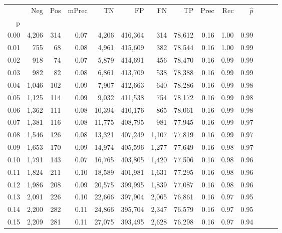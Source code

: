 \begin{tabular}{rrrrrrrrrrrrrr}
\toprule
{} &     Neg &    Pos & mPrec &       TN &       FP &      FN &      TP &  Prec &   Rec & $\hat{p}$ \\
p    &         &        &       &          &          &         &         &       &       &           \\
\midrule
0.00 &   4,206 &    314 &  0.07 &    4,206 &  416,364 &     314 &  78,612 &  0.16 &  1.00 &      0.99 \\
0.01 &     755 &     68 &  0.08 &    4,961 &  415,609 &     382 &  78,544 &  0.16 &  1.00 &      0.99 \\
0.02 &     918 &     74 &  0.07 &    5,879 &  414,691 &     456 &  78,470 &  0.16 &  0.99 &      0.99 \\
0.03 &     982 &     82 &  0.08 &    6,861 &  413,709 &     538 &  78,388 &  0.16 &  0.99 &      0.99 \\
0.04 &   1,046 &    102 &  0.09 &    7,907 &  412,663 &     640 &  78,286 &  0.16 &  0.99 &      0.98 \\
0.05 &   1,125 &    114 &  0.09 &    9,032 &  411,538 &     754 &  78,172 &  0.16 &  0.99 &      0.98 \\
0.06 &   1,362 &    111 &  0.08 &   10,394 &  410,176 &     865 &  78,061 &  0.16 &  0.99 &      0.98 \\
0.07 &   1,381 &    116 &  0.08 &   11,775 &  408,795 &     981 &  77,945 &  0.16 &  0.99 &      0.97 \\
0.08 &   1,546 &    126 &  0.08 &   13,321 &  407,249 &   1,107 &  77,819 &  0.16 &  0.99 &      0.97 \\
0.09 &   1,653 &    170 &  0.09 &   14,974 &  405,596 &   1,277 &  77,649 &  0.16 &  0.98 &      0.97 \\
0.10 &   1,791 &    143 &  0.07 &   16,765 &  403,805 &   1,420 &  77,506 &  0.16 &  0.98 &      0.96 \\
0.11 &   1,824 &    211 &  0.10 &   18,589 &  401,981 &   1,631 &  77,295 &  0.16 &  0.98 &      0.96 \\
0.12 &   1,986 &    208 &  0.09 &   20,575 &  399,995 &   1,839 &  77,087 &  0.16 &  0.98 &      0.96 \\
0.13 &   2,091 &    226 &  0.10 &   22,666 &  397,904 &   2,065 &  76,861 &  0.16 &  0.97 &      0.95 \\
0.14 &   2,200 &    282 &  0.11 &   24,866 &  395,704 &   2,347 &  76,579 &  0.16 &  0.97 &      0.95 \\
0.15 &   2,209 &    281 &  0.11 &   27,075 &  393,495 &   2,628 &  76,298 &  0.16 &  0.97 &      0.94 \\

\end{tabular}
